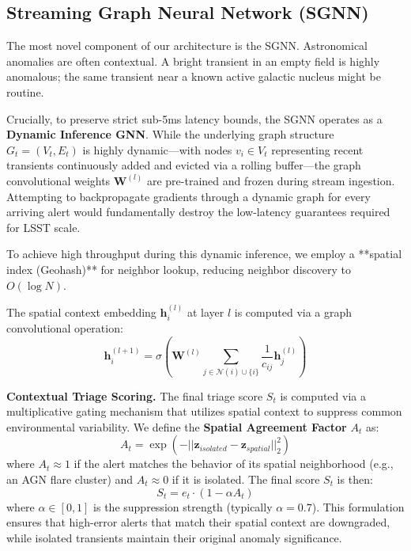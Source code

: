 \documentclass[10pt,journal,compsoc]{IEEEtran}
\begin{document}
\subsection{Streaming Graph Neural Network (SGNN)}
The most novel component of our architecture is the SGNN. Astronomical anomalies are often contextual. A bright transient in an empty field is highly anomalous; the same transient near a known active galactic nucleus might be routine.

Crucially, to preserve strict sub-5ms latency bounds, the SGNN operates as a \textbf{Dynamic Inference GNN}. While the underlying graph structure $G_t = (V_t, E_t)$ is highly dynamic---with nodes $v_i \in V_t$ representing recent transients continuously added and evicted via a rolling buffer---the graph convolutional weights $\mathbf{W}^{(l)}$ are pre-trained and frozen during stream ingestion. Attempting to backpropagate gradients through a dynamic graph for every arriving alert would fundamentally destroy the low-latency guarantees required for LSST scale.

To achieve high throughput during this dynamic inference, we employ a **spatial index (Geohash)** for neighbor lookup, reducing neighbor discovery to $O(\log N)$.

The spatial context embedding $\mathbf{h}^{(l)}_i$ at layer $l$ is computed via a graph convolutional operation:
\begin{equation}
    \mathbf{h}^{(l+1)}_i = \sigma \left( \mathbf{W}^{(l)} \sum_{j \in \mathcal{N}(i) \cup \{i\}} \frac{1}{c_{ij}} \mathbf{h}^{(l)}_j \right)
\end{equation}

\textbf{Contextual Triage Scoring.} The final triage score $S_t$ is computed via a multiplicative gating mechanism that utilizes spatial context to suppress common environmental variability. We define the \textbf{Spatial Agreement Factor} $A_t$ as:
\begin{equation}
    A_t = \exp \left( - || \mathbf{z}_{isolated} - \mathbf{z}_{spatial} ||^2_2 \right)
\end{equation}
where $A_t \approx 1$ if the alert matches the behavior of its spatial neighborhood (e.g., an AGN flare cluster) and $A_t \approx 0$ if it is isolated. The final score $S_t$ is then:
\begin{equation}
    S_t = e_t \cdot (1 - \alpha A_t)
\end{equation}
where $\alpha \in [0, 1]$ is the suppression strength (typically $\alpha=0.7$). This formulation ensures that high-error alerts that match their spatial context are downgraded, while isolated transients maintain their original anomaly significance.
\end{document}
